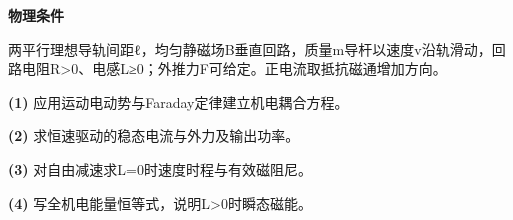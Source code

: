 \textbf{物理条件}\par 两平行理想导轨间距ℓ，均匀静磁场B垂直回路，质量m导杆以速度v沿轨滑动，回路电阻R>0、电感L≥0；外推力F可给定。正电流取抵抗磁通增加方向。
\par\noindent\textbf{(1)} 应用运动电动势与Faraday定律建立机电耦合方程。
\par\noindent\textbf{(2)} 求恒速驱动的稳态电流与外力及输出功率。
\par\noindent\textbf{(3)} 对自由减速求L=0时速度时程与有效磁阻尼。
\par\noindent\textbf{(4)} 写全机电能量恒等式，说明L>0时瞬态磁能。
